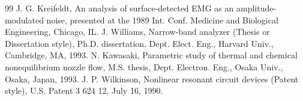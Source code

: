\documentclass[letterpaper, 10 pt, conference]{ieeeconf}  %
\begin{document}
\begin{thebibliography}{99}
 J. G. Kreifeldt, An analysis of surface-detected EMG as an amplitude-modulated noise, presented at the 1989 Int. Conf. Medicine and Biological Engineering, Chicago, IL.
 J. Williams, Narrow-band analyzer (Thesis or Dissertation style), Ph.D. dissertation, Dept. Elect. Eng., Harvard Univ., Cambridge, MA, 1993. 
 N. Kawasaki, Parametric study of thermal and chemical nonequilibrium nozzle flow, M.S. thesis, Dept. Electron. Eng., Osaka Univ., Osaka, Japan, 1993.
 J. P. Wilkinson, Nonlinear resonant circuit devices (Patent style), U.S. Patent 3 624 12, July 16, 1990. 






\end{thebibliography}
\end{document}
